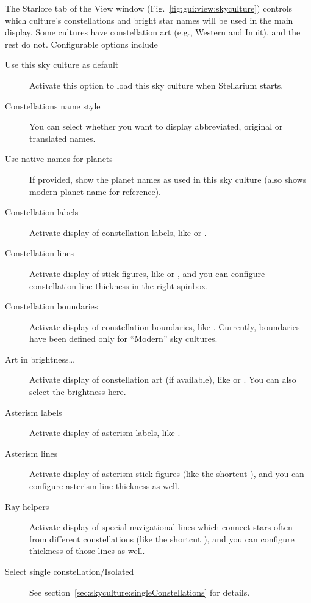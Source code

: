 The Starlore tab of the View window (Fig.~\ref{fig:gui:view:skyculture})
controls which culture's constellations and bright star names will be
used in the main display.  Some cultures have constellation art (e.g.,
Western and Inuit), and the rest do not. Configurable options include
\begin{description}
\item[Use this sky culture as default] Activate this option to load
  this sky culture when Stellarium starts.
\item[Constellations name style]  You can 
  select whether you want to display abbreviated, original or
  translated names.
\item[Use native names for planets] If provided, show the planet names
  as used in this sky culture (also shows modern planet name for
  reference). %
\item[Constellation labels] Activate display of constellation labels, like
   or . 
\item[Constellation lines] Activate display of stick
  figures, like  or , and you
  can configure constellation line thickness in the right spinbox.
\item[Constellation boundaries] Activate display of constellation boundaries,
  like . Currently, boundaries have been defined only for
  ``Modern'' sky cultures.
\item[Art in brightness\ldots] Activate display of constellation
  art (if available), like  or
  . You can also select the brightness here.
\item[Asterism labels] Activate display of asterism labels, like .
\item[Asterism lines] Activate display of asterism stick figures   
  (like the shortcut ), and you can configure asterism line thickness as well.
\item[Ray helpers] Activate display of special navigational lines which 
  connect stars often from different constellations (like the shortcut ),
  and you can configure thickness of those lines as well.
\item[Select single constellation/Isolated] See section~\ref{sec:skyculture:singleConstellations} for details.
\end{description}

